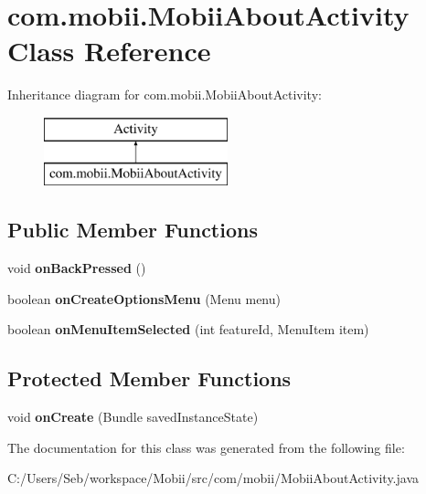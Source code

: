 \hypertarget{classcom_1_1mobii_1_1_mobii_about_activity}{\section{com.\-mobii.\-Mobii\-About\-Activity Class Reference}
\label{classcom_1_1mobii_1_1_mobii_about_activity}
}
Inheritance diagram for com.\-mobii.\-Mobii\-About\-Activity\-:\begin{figure}[H]
\begin{center}
\leavevmode
\includegraphics[height=2.000000cm]{classcom_1_1mobii_1_1_mobii_about_activity}
\end{center}
\end{figure}
\subsection*{Public Member Functions}
\begin{DoxyCompactItemize}
\item 
\hypertarget{classcom_1_1mobii_1_1_mobii_about_activity_a87a9875b57945c451599f3c5309d4407}{void {\bfseries on\-Back\-Pressed} ()}\label{classcom_1_1mobii_1_1_mobii_about_activity_a87a9875b57945c451599f3c5309d4407}

\item 
\hypertarget{classcom_1_1mobii_1_1_mobii_about_activity_a2f34816b73dace0d6c0b03dc5c0b1df9}{boolean {\bfseries on\-Create\-Options\-Menu} (Menu menu)}\label{classcom_1_1mobii_1_1_mobii_about_activity_a2f34816b73dace0d6c0b03dc5c0b1df9}

\item 
\hypertarget{classcom_1_1mobii_1_1_mobii_about_activity_a2553284bcaa68b3a032e413b611be7bb}{boolean {\bfseries on\-Menu\-Item\-Selected} (int feature\-Id, Menu\-Item item)}\label{classcom_1_1mobii_1_1_mobii_about_activity_a2553284bcaa68b3a032e413b611be7bb}

\end{DoxyCompactItemize}
\subsection*{Protected Member Functions}
\begin{DoxyCompactItemize}
\item 
\hypertarget{classcom_1_1mobii_1_1_mobii_about_activity_acd8cfa3e10f73448da1d47ea89697785}{void {\bfseries on\-Create} (Bundle saved\-Instance\-State)}\label{classcom_1_1mobii_1_1_mobii_about_activity_acd8cfa3e10f73448da1d47ea89697785}

\end{DoxyCompactItemize}


The documentation for this class was generated from the following file\-:\begin{DoxyCompactItemize}
\item 
C\-:/\-Users/\-Seb/workspace/\-Mobii/src/com/mobii/Mobii\-About\-Activity.\-java\end{DoxyCompactItemize}
